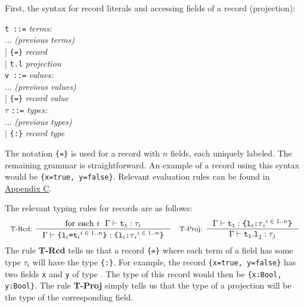 First, the syntax for record literals and accessing fields of a record (projection):
\begin{center}
\texttt{t ::=} 																\hfill \textit{terms:} \\
\hspace{2em} ... 															\hfill \textit{(previous terms)} \\
\hspace{2em} | \texttt{\{=\}}			\hfill \textit{record} \\
\hspace{2em} | \texttt{t.l} 												\hfill \textit{projection} \\
\texttt{v ::=} 																\hfill \textit{values:} \\
\hspace{2em} ... 															\hfill \textit{(previous values)} \\
\hspace{2em} | \texttt{\{=\}}			\hfill \textit{record value} \\
$\tau$ \texttt{::=} 														\hfill \textit{types:} \\
\hspace{2em} ...															\hfill \textit{(previous types)} \\
\hspace{2em} | \texttt{\{:\}}	\hfill \textit{record type}
\end{center}
The notation \texttt{\{=\}} is used for a record with $n$ fields, each uniquely labeled. The remaining grammar is straightforward. An example of a record using this syntax would be \texttt{\{x=true, y=false\}}. Relevant evaluation rules can be found in \hyperref[sec:AppC]{Appendix C}.

The relevant typing rules for records are as follows:
\begin{align*}
\inference[T-Rcd: ]{
  \textnormal{for each $i$} \ \ \Gamma \vdash \tm{t}{i}:\tau_i
}{\Gamma \vdash \texttt{\{\sb{l}{$i$}=\sbsp{t}{$i$}{$i \in 1..n$}\}} : \texttt{\{\sb{l}{$i$}:\sbsp{$\tau$}{$i$}{$i \in 1..n$}\}}}
\quad
\inference[T-Proj: ]{
  \Gamma \vdash \tm{t}{1} : \texttt{\{\sb{l}{$i$}:\sbsp{$\tau$}{$i$}{$i \in 1..n$}\}}
}{\Gamma \vdash \tm{t}{1}.\tm{l}{j} : \tau_j}
\end{align*}
The rule \textbf{T-Rcd} tells us that a record \texttt{\{=\}} where each term of a field  has some type $\tau_i$ will have the type \texttt{\{:\}}. For example, the record \texttt{\{x=true, y=false\}} has two fields \texttt{x} and \texttt{y} of type \Boolt{}. The type of this record would then be \texttt{\{x:Bool, y:Bool\}}. The rule \textbf{T-Proj} simply tells us that the type of a projection will be the type of the corresponding field.

